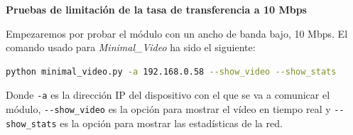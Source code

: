 \newpage

\textbf{Pruebas de limitación de la tasa de transferencia a 10 Mbps}
\vspace{\baselineskip}

Empezaremos por probar el módulo con un ancho de banda bajo, 10 Mbps. El comando usado para \textit{Minimal\_Video} ha sido el siguiente:

\begin{lstlisting}[language=bash]
python minimal_video.py -a 192.168.0.58 --show_video --show_stats
\end{lstlisting}
Donde \verb|-a| es la dirección IP del dispositivo con el que se va a comunicar el módulo, \verb|--show_video| es la opción para mostrar el vídeo en tiempo real y \verb|--show_stats| es la opción para mostrar las estadísticas de la red.
\vspace{\baselineskip}

